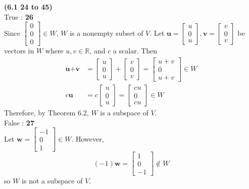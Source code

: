 \textbf{(6.1 24 to 45)} \\
True : \textbf{26} \\
Since $\begin{bmatrix}
	0 \\ 0 \\ 0
\end{bmatrix} \in W$, $W$ is a nonempty subset of $V$. Let $\textbf{u} = \begin{bmatrix}
	u \\ 0 \\ u
\end{bmatrix}, \textbf{v} = \begin{bmatrix}
	v \\ 0 \\ v
\end{bmatrix}$ be vectors in $W$ where $u, v \in \mathbb{R}$, and $c$ a scalar. Then \begin{align*}
	\textbf{u} + \textbf{v} &= \begin{bmatrix}
	u \\ 0 \\ u
	\end{bmatrix} + \begin{bmatrix}
	v \\ 0 \\ v
	\end{bmatrix} = \begin{bmatrix}
	u + v \\ 0 \\ u + v
	\end{bmatrix} \in W \\
	c\textbf{u} &= c\begin{bmatrix}
	u \\ 0 \\ u
	\end{bmatrix} = \begin{bmatrix}
	cu \\ 0 \\ cu
	\end{bmatrix} \in W
\end{align*}
Therefore, by Theorem 6.2, $W$ is a subspace of $V$. \\

False : \textbf{27} \\
Let $\textbf{w} = \begin{bmatrix}
	-1 \\ 0 \\ 1
\end{bmatrix} \in W$. However, \begin{equation*}
	(-1)\textbf{w} = \begin{bmatrix}
		1 \\ 0 \\ -1
	\end{bmatrix} \notin W
\end{equation*} so $W$ is not a subspace of $V$. \\

